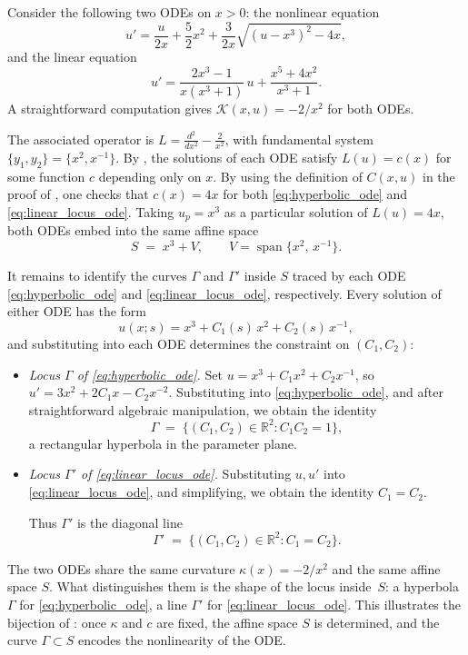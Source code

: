 \documentclass[preprint,a4paper]{elsarticle}
\begin{document}
\begin{example}\label{ex:complete}
Consider the following two ODEs on $x>0$: the nonlinear equation
\begin{equation}\label{eq:hyperbolic_ode}
  u' = \frac{u}{2x} + \frac{5}{2}x^2 + \frac{3}{2x}\sqrt{(u-x^3)^2 - 4x},
\end{equation}
and the linear equation
\begin{equation}\label{eq:linear_locus_ode}
  u' = \frac{2x^3 - 1}{x(x^3 + 1)}\, u + \frac{x^5 + 4x^2}{x^3 + 1}.
\end{equation}
A straightforward computation gives $\mathcal{K}(x,u)=-2/x^{2}$ for both ODEs. 

The associated operator is $L=\frac{d^{2}}{dx^{2}}-\frac{2}{x^{2}}$, with fundamental system $\{y_1,y_2\}=\{x^{2},x^{-1}\}$. By , the solutions of each ODE satisfy $L(u)=c(x)$ for some function $c$ depending only on $x$. By using the definition of $C(x,u)$ in the proof of , one checks that $c(x)=4x$ for both \eqref{eq:hyperbolic_ode} and \eqref{eq:linear_locus_ode}. Taking $u_p=x^{3}$ as a particular solution of $L(u)=4x$, both ODEs embed into the same affine space
\[
  S \;=\; x^{3}+V, \qquad V=\operatorname{span}\{x^{2},\,x^{-1}\}.
\]

It remains to identify the curves $\Gamma$ and $\Gamma'$ inside $S$ traced by each ODE \eqref{eq:hyperbolic_ode} and \eqref{eq:linear_locus_ode}, respectively. Every solution of either ODE has the form
\[
  u(x;s) = x^{3}+C_1(s)\,x^{2}+C_2(s)\,x^{-1},
\]
and substituting into each ODE determines the constraint on $(C_1,C_2)$:
\begin{itemize}
\item \textit{Locus $\Gamma$ of \eqref{eq:hyperbolic_ode}.}
Set $u = x^3+C_1 x^2+C_2 x^{-1}$, so $u' = 3x^2+2C_1 x - C_2 x^{-2}$.
Substituting into \eqref{eq:hyperbolic_ode}, and after straightforward algebraic manipulation, we obtain the identity
\[
  \Gamma \;=\; \{(C_1,C_2)\in\mathbb{R}^2 : C_1 C_2 = 1\},
\]
a rectangular hyperbola in the parameter plane.

\item \textit{Locus $\Gamma'$ of \eqref{eq:linear_locus_ode}.}
Substituting $u,u'$ into \eqref{eq:linear_locus_ode}, and simplifying, we obtain the identity $C_1=C_2.$

Thus $\Gamma'$ is the diagonal line
\[
  \Gamma' \;=\; \{(C_1,C_2)\in\mathbb{R}^2 : C_1 = C_2\}.
\]

\end{itemize}

\medskip
The two ODEs share the same curvature $\kappa(x)=-2/x^{2}$ and the same affine space $S$. What distinguishes them is the shape of the locus inside~$S$: a hyperbola $\Gamma$ for \eqref{eq:hyperbolic_ode}, a line $\Gamma'$ for \eqref{eq:linear_locus_ode}. This illustrates the bijection of : once $\kappa$ and $c$ are fixed, the affine space $S$ is determined, and the curve $\Gamma\subset S$ encodes the nonlinearity of the ODE.
\end{example}
\end{document}
